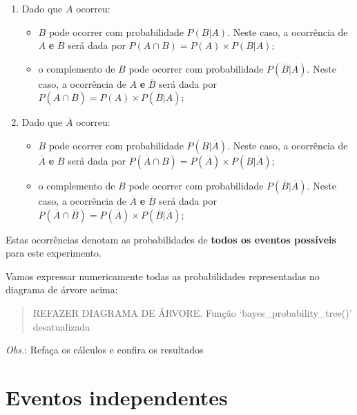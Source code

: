 \documentclass[
]{book}
\providecommand{\tightlist}{%
  \setlength{\itemsep}{0pt}\setlength{\parskip}{0pt}}
\begin{document}
\begin{enumerate}
\def\labelenumi{\arabic{enumi}.}
\tightlist
\item
  Dado que \(A\) ocorreu:

  \begin{itemize}
  \tightlist
  \item
    \(B\) pode ocorrer com probabilidade \(P(B|A)\). Neste caso, a ocorrência de \(A\) \textbf{e} \(B\) será dada por \(P(A \cap B) = P(A) \times P(B|A)\);
  \item
    o complemento de \(B\) pode ocorrer com probabilidade \(P(\overline{B}|A)\). Neste caso, a ocorrência de \(A\) \textbf{e} \(\overline{B}\) será dada por \(P(A \cap \overline{B}) = P(A) \times P(\overline{B}|A)\);
  \end{itemize}
\item
  Dado que \(\overline{A}\) ocorreu:

  \begin{itemize}
  \tightlist
  \item
    \(B\) pode ocorrer com probabilidade \(P(B|\overline{A})\). Neste caso, a ocorrência de \(\overline{A}\) \textbf{e} \(B\) será dada por \(P(\overline{A} \cap B) = P(\overline{A}) \times P(B|\overline{A})\);
  \item
    o complemento de \(B\) pode ocorrer com probabilidade \(P(\overline{B}|\overline{A})\). Neste caso, a ocorrência de \(\overline{A}\) \textbf{e} \(\overline{B}\) será dada por \(P(\overline{A} \cap \overline{B}) = P(\overline{A}) \times P(\overline{B}|\overline{A})\);
  \end{itemize}
\end{enumerate}

Estas ocorrências denotam as probabilidades de \textbf{todos os eventos possíveis} para este experimento.

Vamos expressar numericamente todas as probabilidades representadas no diagrama de árvore acima:

\begin{quote}
REFAZER DIAGRAMA DE ÁRVORE. Função `bayes\_probability\_tree()' desatualizada
\end{quote}

\emph{Obs.}: Refaça os cálculos e confira os resultados

\hypertarget{eventos-independentes}{%
\section{Eventos independentes}\label{eventos-independentes}}
\end{document}
